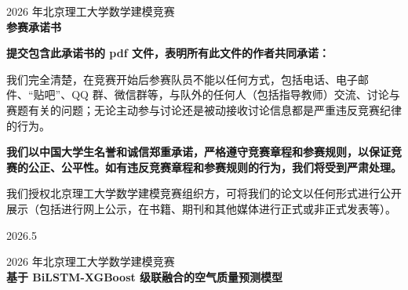 \documentclass[a4paper, 12pt]{ctexart} %
\begin{document}

\begin{titlepage}
\thispagestyle{empty} %

\begin{center}
    {\small 2026 年北京理工大学数学建模竞赛}\\[1.5cm]
    {\LARGE \bfseries 参赛承诺书}\\[1.5cm]
\end{center}

\noindent\textbf{提交包含此承诺书的 pdf 文件，表明所有此文件的作者共同承诺：}

我们完全清楚，在竞赛开始后参赛队员不能以任何方式，包括电话、电子邮件、“贴吧”、QQ 群、微信群等，与队外的任何人（包括指导教师）交流、讨论与赛题有关的问题；无论主动参与讨论还是被动接收讨论信息都是严重违反竞赛纪律的行为。

\textbf{我们以中国大学生名誉和诚信郑重承诺，严格遵守竞赛章程和参赛规则，以保证竞赛的公正、公平性。如有违反竞赛章程和参赛规则的行为，我们将受到严肃处理。}

我们授权北京理工大学数学建模竞赛组织方，可将我们的论文以任何形式进行公开展示（包括进行网上公示，在书籍、期刊和其他媒体进行正式或非正式发表等）。

\begin{flushright}
2026.5
\end{flushright}

\end{titlepage}

\newpage
\setcounter{page}{1} 
\thispagestyle{plain}

\begin{center}
    {\small 2026 年北京理工大学数学建模竞赛}\\[1cm]
    {\Large \bfseries 基于 BiLSTM-XGBoost 级联融合的空气质量预测模型}\\[1cm] 
\end{center}

\renewcommand{\abstractname}{\Large 摘要}
\end{document}
